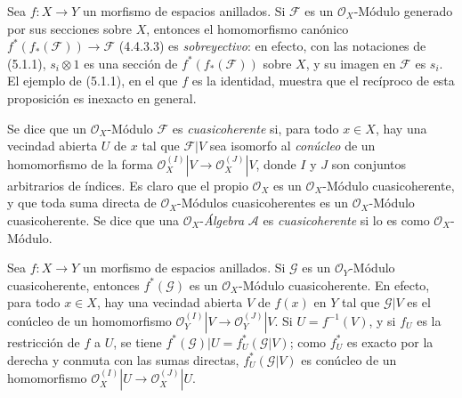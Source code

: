 \begin{env}[5.1.2]
\label{0.5.1.2-fr}
Sea $f:X\to Y$ un morfismo de espacios anillados. Si $\mathcal{F}$ es un
$\mathcal{O}_X$-Módulo generado por sus secciones sobre $X$, entonces
el homomorfismo canónico
$f^*(f_*(\mathcal{F}))\to\mathcal{F}$ (4.4.3.3) es \emph{sobreyectivo}: en
efecto, con las notaciones de (5.1.1), $s_i\otimes1$ es una sección de
$f^*(f_*(\mathcal{F}))$ sobre $X$, y su imagen en $\mathcal{F}$ es
$s_i$. El ejemplo de (5.1.1), en el que $f$ es la identidad, muestra que el recíproco de
esta proposición es inexacto en general.
\end{env}

\begin{env}[5.1.3]
\label{0.5.1.3-fr}
Se dice que un $\mathcal{O}_X$-Módulo $\mathcal{F}$ es \emph{cuasicoherente}
si, para todo $x\in X$, hay una vecindad abierta $U$ de $x$ tal que
$\mathcal{F}|V$ sea isomorfo al \emph{conúcleo} de un homomorfismo de la
forma
$\mathcal{O}_X^{(I)}|V\to\mathcal{O}_X^{(J)}|V$, donde $I$ y $J$ son
conjuntos arbitrarios de índices. Es claro que el propio $\mathcal{O}_X$ es
un $\mathcal{O}_X$-Módulo cuasicoherente, y que toda suma directa de
$\mathcal{O}_X$-Módulos cuasicoherentes es un $\mathcal{O}_X$-Módulo
cuasicoherente. Se dice que una $\mathcal{O}_X$-\emph{Álgebra} $\mathcal{A}$ es
\emph{cuasicoherente} si lo es como $\mathcal{O}_X$-Módulo.
\end{env}

\begin{env}[5.1.4]
\label{0.5.1.4-fr}
Sea $f:X\to Y$ un morfismo de espacios anillados. Si $\mathcal{G}$ es un
$\mathcal{O}_Y$-Módulo cuasicoherente, entonces $f^*(\mathcal{G})$ es un
$\mathcal{O}_X$-Módulo cuasicoherente. En efecto, para todo $x\in X$, hay
una vecindad abierta $V$ de $f(x)$ en $Y$ tal que $\mathcal{G}|V$ es el
conúcleo de un homomorfismo
$\mathcal{O}_Y^{(I)}|V\to\mathcal{O}_Y^{(J)}|V$. Si $U=f^{-1}(V)$, y si
$f_U$ es la restricción de $f$ a $U$, se tiene
$f^*(\mathcal{G})|U=f_U^*(\mathcal{G}|V)$; como $f_U^*$ es exacto por la derecha
y conmuta con las sumas directas, $f_U^*(\mathcal{G}|V)$ es conúcleo de un
homomorfismo
$\mathcal{O}_X^{(I)}|U\to\mathcal{O}_X^{(J)}|U$.
\end{env}

